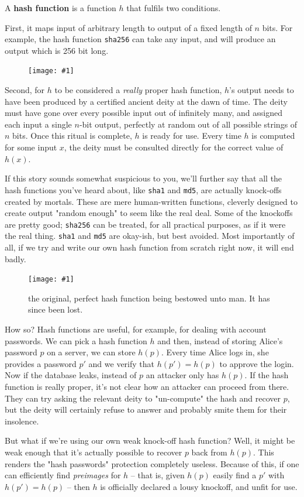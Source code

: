 \documentclass{article}
\newcommand{\wrapimageleftcap}[2] {\begin{figure}\begin{center}\texttt{[image: \#1]}\end{center}\caption{#2}\end{figure}
}
\newcommand{\wrapimageright}[1] {
    \begin{figure}
        \begin{center}
            \texttt{[image: \#1]} 
        \end{center}
    \end{figure}
}
\newcommand{\code}[1]{\colorbox{ubuntuback}{\texttt{#1}}}
\begin{document}
A \textbf{hash function} is a function $h$ that fulfils two conditions. 

First, it maps input of arbitrary length to output of a fixed length of $n$ bits. For example, the hash function \code{sha256} can take any input, and will produce an output which is 256 bit long. 

\wrapimageright{./images/hash_functions.jpg}
Second, for $h$ to be considered a \textit{really} proper hash function, $h$'s output needs to have been produced by a certified ancient deity at the dawn of time. The deity must have gone over every possible input out of infinitely many, and assigned each input a single $n$-bit output, perfectly at random out of all possible strings of $n$ bits. Once this ritual is complete, $h$ is ready for use. Every time $h$ is computed for some input $x$, the deity must be consulted directly for the correct value of $h(x)$.


If this story sounds somewhat suspicious to you, we'll further say that all the hash functions you've heard about, like \code{sha1} and \code{md5}, are actually knock-offs created by mortals. These are mere human-written functions, cleverly designed to create output "random enough" to seem like the real deal. Some of the knockoffs are pretty good; \code{sha256} can be treated, for all practical purposes, as if it were the real thing. \code{sha1} and \code{md5} are okay-ish, but best avoided. Most importantly of all, if we try and write our own hash function from scratch right now, it will end badly.


\wrapimageleftcap{./images/hash_function_creation.jpg}{the original, perfect hash function being bestowed unto man. It has since been lost.}

How so? Hash functions are useful, for example, for dealing with account passwords. We can pick a hash function $h$ and then, instead of storing Alice's password $p$ on a server, we can store $h(p)$. Every time Alice logs in, she provides a password $p'$ and we verify that $h(p')=h(p)$ to approve the login. Now if the database leaks, instead of $p$ an attacker only has $h(p)$. If the hash function is really proper, it's not clear how an attacker can proceed from there. They can try asking the relevant deity to "un-compute" the hash and recover $p$, but the deity will certainly refuse to answer and probably smite them for their insolence.

But what if we're using our own weak knock-off hash function? Well, it might be weak enough that it's actually possible to recover $p$ back from $h(p)$. This renders the "hash passwords" protection completely useless. Because of this, if one can efficiently find \textit{preimages} for $h$ -- that is, given $h(p)$ easily find a $p'$ with $h(p')=h(p)$ -- then $h$ is officially declared a lousy knockoff, and unfit for use.
\end{document}
